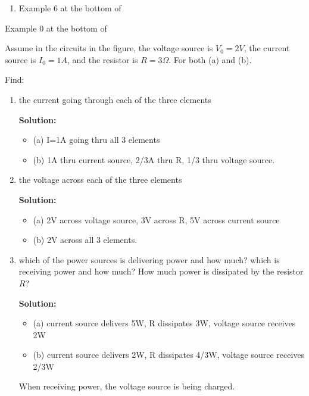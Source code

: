 \begin{enumerate}



\item Example 6 at the bottom of 


\end{enumerate}



\item Example 0 at the bottom of 

\item Assume in the circuits in the figure, the voltage source is $V_0=2V$,
	the current source is $I_0=1A$, and the resistor is $R=3\Omega$.
	For both (a) and (b).


Find:
\begin{enumerate}
\item the current going through each of the three elements

{\bf Solution:}
\begin{itemize}
\item (a) I=1A going thru all 3 elements 
\item (b) 1A thru current source, 2/3A thru R, 1/3 thru voltage source.
\end{itemize}

\item the voltage across each of the three elements

{\bf Solution:}
\begin{itemize}
\item (a) 2V across voltage source, 3V across R, 5V across current source
\item (b) 2V across all 3 elements.
\end{itemize}

\item which of the power sources is delivering power and how much? which is 
	receiving power and how much? How much power is dissipated by the
	resistor $R$?

{\bf Solution:}
\begin{itemize}
\item (a) current source delivers 5W, R dissipates 3W, voltage source 
	receives 2W
\item (b) current source delivers 2W, R dissipates 4/3W, voltage source 
	receives 2/3W 
\end{itemize}
When receiving power, the voltage source is being charged.
\end{enumerate}

